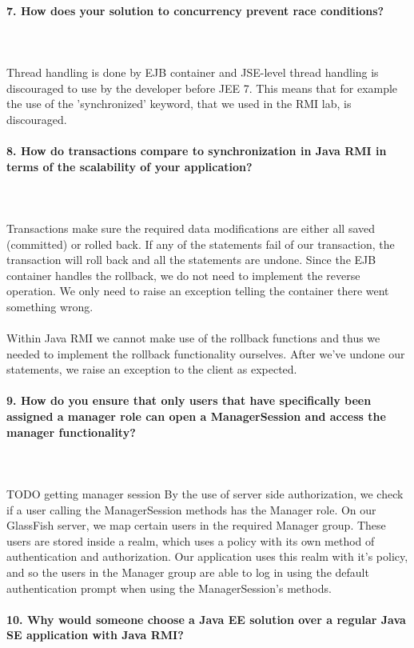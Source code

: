 \documentclass{ds-report}
\begin{document}
 

	\paragraph{7. How does your solution to concurrency prevent race conditions?} \mbox{}\\\\
Thread handling is done by EJB container and JSE-level thread handling is discouraged to use by the developer before JEE 7. This means that for example the use of the 'synchronized' keyword, that we used in the RMI lab, is discouraged.




	\paragraph{8. How do transactions compare to synchronization in Java RMI in terms of the scalability of your application?} \mbox{}\\\\
Transactions make sure the required data modifications are either all saved (committed) or rolled back. If any of the statements fail of our transaction, the transaction will roll back and all the statements are undone. Since the EJB container handles the rollback, we do not need to implement the reverse operation. We only need to raise an exception telling the container there went something wrong.\mbox{}\\\\
Within Java RMI we cannot make use of the rollback functions and thus we needed to implement the rollback functionality ourselves. After we've undone our statements, we raise an exception to the client as expected.





	\paragraph{9. How do you ensure that only users that have specifically been assigned a manager role can open a ManagerSession and access the manager functionality?} \mbox{}\\\\
	TODO getting manager session
By the use of server side authorization, we check if a user calling the ManagerSession methods has the Manager role. On our GlassFish server, we map certain users in the required Manager group. These users are stored inside a realm, which uses a policy with its own method of authentication and authorization. Our application uses this realm with it's policy, and so the users in the Manager group are able to log in using the default authentication prompt when using the ManagerSession's methods. 







	\paragraph{10.  Why would someone choose a Java EE solution over a regular Java SE application with Java RMI?} \mbox{}\\\\



	
	\clearpage

	
\end{document}
